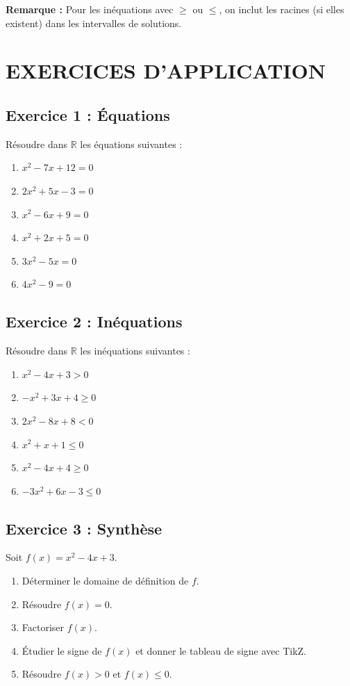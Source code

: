 \documentclass[12pt,a4paper]{article}
\newcounter{solution}
\begin{document}
\vspace{1em}
\noindent \textbf{Remarque :} Pour les inéquations avec $\geq$ ou $\leq$, on inclut les racines (si elles existent) dans les intervalles de solutions.

\newpage
\section*{\color{myred} EXERCICES D'APPLICATION}

\subsection*{\color{myred} Exercice 1 : Équations}
Résoudre dans $\mathbb{R}$ les équations suivantes :
\begin{enumerate}[label=\alph*)]
    \item $x^2 - 7x + 12 = 0$
    \item $2x^2 + 5x - 3 = 0$
    \item $x^2 - 6x + 9 = 0$
    \item $x^2 + 2x + 5 = 0$
    \item $3x^2 - 5x = 0$
    \item $4x^2 - 9 = 0$
\end{enumerate}

\subsection*{\color{myred} Exercice 2 : Inéquations}
Résoudre dans $\mathbb{R}$ les inéquations suivantes :
\begin{enumerate}[label=\alph*)]
    \item $x^2 - 4x + 3 > 0$
    \item $-x^2 + 3x + 4 \geq 0$
    \item $2x^2 - 8x + 8 < 0$
    \item $x^2 + x + 1 \leq 0$
    \item $x^2 - 4x + 4 \geq 0$
    \item $-3x^2 + 6x - 3 \leq 0$
\end{enumerate}

\subsection*{\color{myred} Exercice 3 : Synthèse}
Soit $f(x) = x^2 - 4x + 3$.
\begin{enumerate}[label=\arabic*)]
    \item Déterminer le domaine de définition de $f$.
    \item Résoudre $f(x) = 0$.
    \item Factoriser $f(x)$.
    \item Étudier le signe de $f(x)$ et donner le tableau de signe avec TikZ.
    \item Résoudre $f(x) > 0$ et $f(x) \leq 0$.
\end{enumerate}
\end{document}
